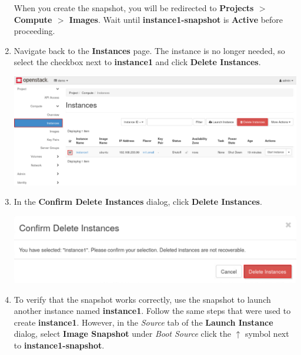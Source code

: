 \documentclass[letterpaper, 12pt]{article}
\begin{document}
\begin{enumerate}
    \begin{stopbox}
        When you create the snapshot, you will be redirected to \textbf{Projects $>$ Compute $>$ Images}.
        Wait until \textbf{instance1-snapshot} is \textbf{Active} before proceeding.
    \end{stopbox}

    \item Navigate back to the \textbf{Instances} page.
    The instance is no longer needed, so select the checkbox next to \textbf{instance1} and click \textbf{Delete Instances}.

    \begin{center}
        \includegraphics[width=\linewidth]{images/part1/step15.png}
    \end{center}

    \item In the \textbf{Confirm Delete Instances} dialog, click \textbf{Delete Instances}.

    \begin{center}
        \includegraphics[width=\linewidth]{images/part1/step16.png}
    \end{center}

    \item To verify that the snapshot works correctly, use the snapshot to launch another instance named \textbf{instance1}.
    Follow the same steps that were used to create \textbf{instance1}.
    However, in the \textit{Source} tab of the \textbf{Launch Instance} dialog, select \textbf{Image Snapshot} under \textit{Boot Source} click the $\uparrow$ symbol next to \textbf{instance1-snapshot}.


\end{enumerate}
\end{document}
